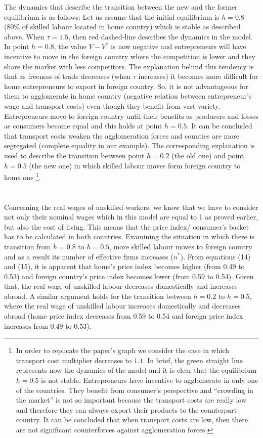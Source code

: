 \documentclass[11pt]{article}
\begin{document}
The dynamics that describe the transition between the new and the former equilibrium is as follows: Let us assume that the initial equilibrium is $h=0.8$ (80\% of skilled labour located in home country) which is stable as described above. When $\tau=1.5$, then red dashed-line describes the dynamics in the model. In point $h=0.8$, the value $V-V^{\ast}$ is now negative and entrepreneurs will have incentive to move in the foreign country where the competition is lower and they share the market with less competitors. The explanation behind this tendency is that as freeness of trade decreases (when $\tau$ increases) it becomes more difficult for home entrepreneurs to export in foreign country. So, it is not advantageous for them to agglomerate in home country (negative relation between entrepreneur’s wage and transport costs) even though they benefit from vast variety. Entrepreneurs move to foreign country until their benefits as producers and losses as consumers become equal and this holds at point  $h=0.5$. It can be concluded that transport costs weaken the agglomeration forces and counties are more segregated (complete equality in our example). The corresponding explanation is used to describe the transition between point $h=0.2$ (the old one) and point $h=0.5$ (the new one) in which skilled labour moves form foreign country to home one
\footnote{In order to replicate the paper’s graph we consider the case in which transport cost multiplier decreases to $1.1$. In brief, the green straight line represents now the dynamics of the model and it is clear that the equilibrium $h = 0.5$ is not stable. Entrepreneurs have incentive to agglomerate in only one of the countries. They benefit from consumer’s perspective and ``crowding in the market'' is not so important because the transport costs are really low and therefore they can always export their products to the counterpart country. It can be concluded that when transport costs are low, then there are not significant counterforces against agglomeration forces.}.   
\\
\\
\\
Concerning the real wages of unskilled workers, we know that we have to consider not only their nominal wages which in this model are equal to 1 as proved earlier, but also the cost of living. This means that the price index/ consumer's basket has to be calculated in both countries. Examining the situation in which there is transition from $h=0.8$ to $h=0.5$, more skilled labour moves to foreign country and as a result its number of effective firms increases ($n^{\ast}$). From equations (14) and (15), it is apparent that home’s price index becomes higher (from 0.49 to 0.53) and foreign country’s price index becomes lower (from 0.59 to 0.54). Given that, the real wage of unskilled labour decreases domestically and increases abroad. A similar argument holds for the transition between $h=0.2$ to $h=0.5$, where the real wage of unskilled labour increases domestically and decreases abroad (home price index decreases from 0.59 to 0.54 and foreign price index increases from 0.49 to 0.53). 
\end{document}
